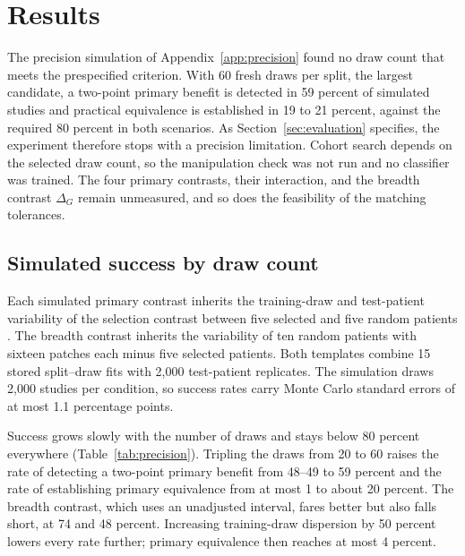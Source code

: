 \section{Results}
\label{sec:results}
The precision simulation of Appendix~\ref{app:precision} found no draw count that meets the prespecified criterion. With 60 fresh draws per split, the largest candidate, a two-point primary benefit is detected in 59 percent of simulated studies and practical equivalence is established in 19 to 21 percent, against the required 80 percent in both scenarios. As Section~\ref{sec:evaluation} specifies, the experiment therefore stops with a precision limitation. Cohort search depends on the selected draw count, so the manipulation check was not run and no classifier was trained. The four primary contrasts, their interaction, and the breadth contrast $\Delta_G$ remain unmeasured, and so does the feasibility of the matching tolerances.

\subsection{Simulated success by draw count}
\label{sec:precision-results}
Each simulated primary contrast inherits the training-draw and test-patient variability of the selection contrast between five selected and five random patients \citep{queisler2026shortageSelection}. The breadth contrast inherits the variability of ten random patients with sixteen patches each minus five selected patients. Both templates combine 15 stored split--draw fits with 2,000 test-patient replicates. The simulation draws 2,000 studies per condition, so success rates carry Monte Carlo standard errors of at most 1.1 percentage points.

Success grows slowly with the number of draws and stays below 80 percent everywhere (Table~\ref{tab:precision}). Tripling the draws from 20 to 60 raises the rate of detecting a two-point primary benefit from 48--49 to 59 percent and the rate of establishing primary equivalence from at most 1 to about 20 percent. The breadth contrast, which uses an unadjusted interval, fares better but also falls short, at 74 and 48 percent. Increasing training-draw dispersion by 50 percent lowers every rate further; primary equivalence then reaches at most 4 percent.

